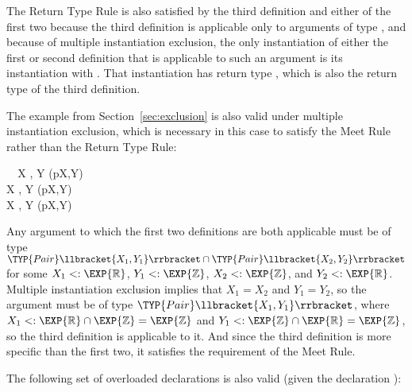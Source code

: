 \documentclass[10pt]{sigplanconf}
\newcommand{\subtypeof}{\ensuremath{<:}}
\newcommand{\ob}[1]{\ensuremath{\llbracket {#1} \rrbracket}}
\begin{document}
The Return Type Rule is also satisfied by the third definition 
and either of the first two 
because the third definition is applicable 
only to arguments of type ,
and because of multiple instantiation exclusion, 
the only instantiation of either the first or second definition 
that is applicable to such an argument 
is its instantiation with .
That instantiation has return type , 
which is also the return type of the third definition.

The  example from Section~\ref{sec:exclusion} is also valid 
under multiple instantiation exclusion,
which is necessary in this case 
to satisfy the Meet Rule rather than the Return Type Rule:

\small
\begin{FortressCode}
{\tt ~~}\+\llbracket{}X \SHORTCUT{<} , Y \SHORTCUT{<} \rrbracket\bigl(p\COLON {}\llbracket{}X,Y\rrbracket\bigr)\COLON {} \\
  \llbracket{}X \SHORTCUT{<} , Y \SHORTCUT{<} \rrbracket\bigl(p\COLON {}\llbracket{}X,Y\rrbracket\bigr)\COLON {} \\
  \llbracket{}X \SHORTCUT{<} , Y \SHORTCUT{<} \rrbracket\bigl(p\COLON {}\llbracket{}X,Y\rrbracket\bigr)\COLON {}\-
\end{FortressCode}
\normalsize
Any argument to which the first two definitions are both applicable 
must be of type $\TYP{Pair}\ob{X_1,Y_1} \cap \TYP{Pair}\ob{X_2,Y_2}$
for some $X_1 \subtypeof \EXP{\mathbb{R}}$, 
$Y_1 \subtypeof \EXP{\mathbb{Z}}$, 
$X_2 \subtypeof \EXP{\mathbb{Z}}$, 
and $Y_2 \subtypeof \EXP{\mathbb{R}}$.
Multiple instantiation exclusion 
implies that $X_1 = X_2$ and $Y_1 = Y_2$,
so the argument must be of type $\TYP{Pair}\ob{X_1,Y_1}$, 
where $X_1 \subtypeof \EXP{\mathbb{R}} \cap \EXP{\mathbb{Z}} = \EXP{\mathbb{Z}}$
and $Y_1 \subtypeof \EXP{\mathbb{Z}} \cap \EXP{\mathbb{R}} = \EXP{\mathbb{Z}}$, 
so the third definition is applicable to it.
And since the third definition is more specific than the first two,
it satisfies the requirement of the Meet Rule.

The following set of overloaded declarations is also valid 
(given the declaration ):
\end{document}
